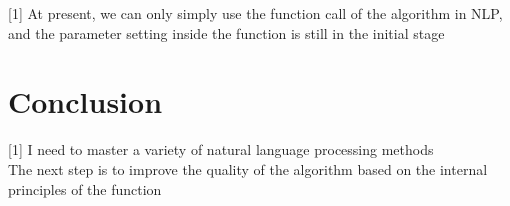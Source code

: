   [1] At present, we can only simply use the function call of the algorithm in NLP, and the parameter setting inside the function is still in the initial stage
 

\section{Conclusion}
[1] I need to master a variety of natural language processing methods\\
[2] The next step is to improve the quality of the algorithm based on the internal principles of the function\\


















